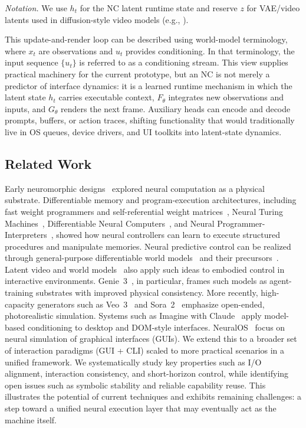 \noindent\textit{Notation.} We use $h_t$ for the NC latent runtime state and reserve $z$ for VAE/video latents used in diffusion-style video models (e.g., ). 

This update-and-render loop can be described using world-model terminology, where $x_t$ are observations and $u_t$ provides conditioning.
In that terminology, the input sequence $\{u_t\}$ is referred to as a conditioning stream.
This view supplies practical machinery for the current prototype, but an NC is not merely a predictor of interface dynamics: it is a learned runtime mechanism in which the latent state $h_t$ carries executable context, $F_\theta$ integrates new observations and inputs, and $G_\theta$ renders the next frame.
Auxiliary heads can encode and decode prompts, buffers, or action traces, shifting functionality that would traditionally live in OS queues, device drivers, and UI toolkits into latent-state dynamics.

\subsection{Related Work}
\label{section:prelim-related}

Early neuromorphic designs~\citep{mead2012analog} explored neural computation as a physical substrate.
Differentiable memory and program-execution architectures, including fast weight programmers and self-referential weight matrices~\citep{schmidhuber92fastweights,schmidhuber93selfref,schmidhuber93ratio}, Neural Turing Machines~\citep{graves2014neural},
Differentiable Neural Computers~\citep{graves2016hybrid}, and Neural Programmer-Interpreters~\citep{reed2015neural}, showed how neural controllers can learn to execute structured procedures and manipulate memories. Neural predictive control can be realized through
general-purpose differentiable world models~\citep{schmidhuber1990making} and their precursors~\citep{werbos1987learning,munro1987dual,nguyen1990truck}.
Latent video and world models~\citep{schmidhuber2015learning,ha2018world,hafner2019learning,hafner2019dream,bruce2024genie} also apply such ideas to embodied control in interactive environments.
Genie~3~\citep{bruce2024genie}, in particular, frames such models as agent-training substrates with improved physical consistency.
More recently, high-capacity generators such as Veo~3~\citep{google_veo3_1_2025} and Sora~2~\citep{openai_sora2_2025} emphasize open-ended, photorealistic simulation. 
Systems such as Imagine with Claude~\citep{anthropic_claude_sonnet4_5_2025} apply model-based conditioning to desktop and DOM-style interfaces.
NeuralOS~\citep{rivard2025neuralos} focus on neural simulation of graphical interfaces (GUIs). We extend this to a broader set of interaction paradigms (GUI + CLI) scaled to more practical scenarios in a unified framework. We systematically study key properties such as I/O alignment, interaction consistency, and short-horizon control, while identifying open issues such as symbolic stability and reliable capability reuse. This illustrates the potential of current techniques and exhibits remaining challenges: a step toward a unified neural execution layer that may eventually act as the machine itself. 